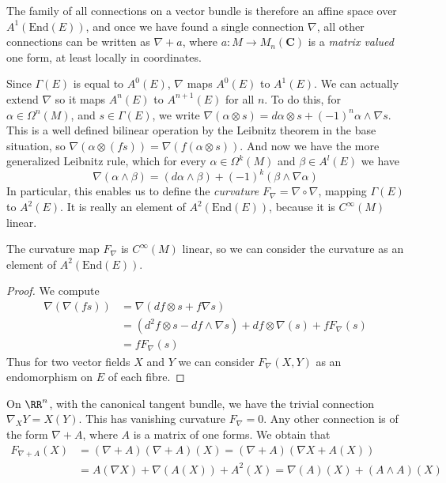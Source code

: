 \begin{remark}
    The family of all connections on a vector bundle is therefore an affine space over $A^1(\text{End}(E))$, and once we have found a single connection $\nabla$, all other connections can be written as $\nabla + a$, where $a: M \to M_n(\mathbf{C})$ is a {\it matrix valued} one form, at least locally in coordinates.
\end{remark}

Since $\Gamma(E)$ is equal to $A^0(E)$, $\nabla$ maps $A^0(E)$ to $A^1(E)$. We can actually extend $\nabla$ so it maps $A^n(E)$ to $A^{n+1}(E)$ for all $n$. To do this, for $\alpha \in \Omega^n(M)$, and $s \in \Gamma(E)$, we write $\nabla(\alpha \otimes s) = d\alpha \otimes s + (-1)^n \alpha \wedge \nabla s$. This is a well defined bilinear operation by the Leibnitz theorem in the base situation, so $\nabla(\alpha \otimes (fs)) = \nabla(f (\alpha \otimes s))$. And now we have the more generalized Leibnitz rule, which for every $\alpha \in \Omega^k(M)$ and $\beta \in A^l(E)$ we have
%
\[ \nabla(\alpha \wedge \beta) = (d\alpha \wedge \beta) + (-1)^k (\beta \wedge \nabla \alpha) \]
%
In particular, this enables us to define the \emph{curvature} $F_\nabla = \nabla \circ \nabla$, mapping $\Gamma(E)$ to $A^2(E)$. It is really an element of $A^2(\text{End}(E))$, because it is $C^\infty(M)$ linear.

\begin{theorem}
    The curvature map $F_\nabla$ is $C^\infty(M)$ linear, so we can consider the curvature as an element of $A^2(\text{End}(E))$.
\end{theorem}
\begin{proof}
    We compute
    \begin{align*}
        \nabla(\nabla(fs)) &= \nabla(df \otimes s + f \nabla s)\\
        &= (d^2f \otimes s - df \wedge \nabla s) + df \otimes \nabla(s) + f F_\nabla(s)\\
        &= f F_\nabla(s)
    \end{align*}
    Thus for two vector fields $X$ and $Y$ we can consider $F_\nabla(X,Y)$ as an endomorphism on $E$ of each fibre.
\end{proof}

\begin{example}
    On $\RR^n$, with the canonical tangent bundle, we have the trivial connection $\nabla_X Y = X(Y)$. This has vanishing curvature $F_\nabla = 0$. Any other connection is of the form $\nabla + A$, where $A$ is a matrix of one forms. We obtain that
    \begin{align*}
        F_{\nabla + A}(X) &= (\nabla + A)(\nabla + A)(X) = (\nabla + A)(\nabla X + A(X))\\
        &= A(\nabla X) + \nabla(A(X)) + A^2(X) = \nabla(A)(X) + (A \wedge A)(X)
    \end{align*}
\end{example}






